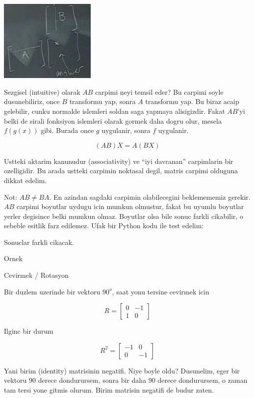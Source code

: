 \documentclass[12pt,fleqn]{article}
\begin{document}
\includegraphics[height=4cm]{3_4.png}

Sezgisel (intuitive) olarak $AB$ carpimi neyi temsil eder? Bu carpimi soyle
dusunebiliriz, once $B$ transformu yap, sonra $A$ transformu yap. Bu biraz
acaip gelebilir, cunku normalde islemleri soldan saga yapmaya
alisigizdir. Fakat $AB$'yi belki de sirali fonksiyon islemleri olarak
gormek daha dogru olur, mesela $f(g(x))$ gibi. Burada once $g$ uygulanir,
sonra $f$ uygulanir. 

\[ (AB)X = A(BX) \]

Ustteki aktarim kanunudur (associativity) ve ``iyi davranan'' carpimlarin
bir ozelligidir. Bu arada ustteki carpimin noktasal degil, matris carpimi
olduguna dikkat edelim. 

Not: $AB \ne BA$. En azindan sagdaki carpimin olabilecegini beklemememiz
gerekir. $AB$ carpimi boyutlar uydugu icin mumkun olmustur, fakat bu uyumlu
boyutlar yerler degisince belki mumkun olmaz. Boyutlar olsa bile sonuc
farkli cikabilir, o sebeble esitlik farz edilemez. Ufak bir Python kodu ile
test edelim:



Sonuclar farkli cikacak. 

Ornek

Cevirmek / Rotasyon

Bir duzlem uzerinde bir vektoru $90^o$, saat yonu tersine cevirmek icin 

\[ R =
\left[\begin{array}{rr}
0 & -1 \\
1 & 0
\end{array}\right]
 \]

Ilginc bir durum

\[ R^2 =
\left[\begin{array}{rr}
-1 & 0 \\
0 & -1
\end{array}\right]
 \]

Yani birim (identity) matrisinin negatifi. Niye boyle oldu? Dusunelim, eger
bir vektoru 90 derece dondurursem, sonra bir daha 90 derece dondurursem, o
zaman tam tersi yone gitmis olurum. Birim matrisin negatifi de budur
zaten. 
\end{document}
